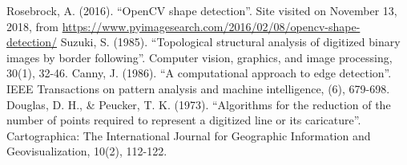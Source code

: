 \documentclass[]{IEEEtran}
\begin{document}
  \begin{thebibliography}{00}
     Rosebrock, A. (2016). ``OpenCV shape detection''. Site visited on November 13, 2018, from \url{https://www.pyimagesearch.com/2016/02/08/opencv-shape-detection/}
     Suzuki, S. (1985). ``Topological structural analysis of digitized binary images by border following''. Computer vision, graphics, and image processing, 30(1), 32-46.
     Canny, J. (1986). ``A computational approach to edge detection''. IEEE Transactions on pattern analysis and machine intelligence, (6), 679-698.
     Douglas, D. H., \& Peucker, T. K. (1973). ``Algorithms for the reduction of the number of points required to represent a digitized line or its caricature''. Cartographica: The International Journal for Geographic Information and Geovisualization, 10(2), 112-122.
  \end{thebibliography}
\end{document}
